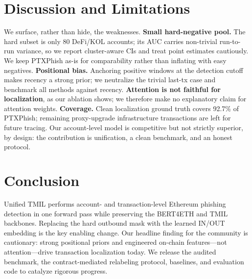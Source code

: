 \documentclass[conference]{IEEEtran}
\begin{document}
\section{Discussion and Limitations}
We surface, rather than hide, the weaknesses. \textbf{Small hard-negative pool.}
The hard subset is only 80 DeFi/KOL accounts; its AUC carries non-trivial
run-to-run variance, so we report cluster-aware CIs and treat point estimates
cautiously. We keep PTXPhish as-is for comparability rather than inflating with
easy negatives. \textbf{Positional bias.} Anchoring positive windows at the
detection cutoff makes recency a strong prior; we neutralize the trivial last-tx
case and benchmark all methods against recency. \textbf{Attention is not faithful
for localization}, as our ablation shows; we therefore make no explanatory claim
for attention weights. \textbf{Coverage.} Clean localization ground truth covers
92.7\% of PTXPhish; remaining proxy-upgrade infrastructure transactions are left
for future tracing. Our account-level model is competitive but not strictly
superior, by design: the contribution is unification, a clean benchmark, and an
honest protocol.

\section{Conclusion}
Unified TMIL performs account- and transaction-level Ethereum phishing detection in
one forward pass while preserving the BERT4ETH and TMIL backbones. Replacing the
hard outbound mask with the learned IN/OUT embedding is the key enabling change.
Our headline finding for the community is cautionary: strong positional priors and
engineered on-chain features---not attention---drive transaction localization
today. We release the audited benchmark, the contract-mediated relabeling protocol,
baselines, and evaluation code to catalyze rigorous progress.
\end{document}
